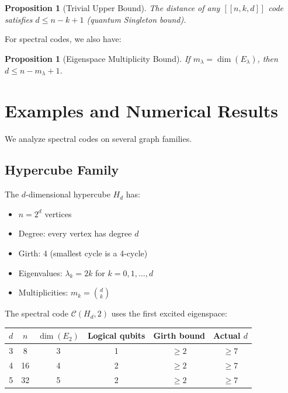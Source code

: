 \documentclass[11pt,a4paper]{article}
\newtheorem{proposition}[theorem]{Proposition}
\theoremstyle{definition}
\newcommand{\codespace}{\mathcal{C}}
\begin{document}
\begin{proposition}[Trivial Upper Bound]
The distance of any $[[n, k, d]]$ code satisfies $d \leq n - k + 1$ (quantum Singleton bound).
\end{proposition}

For spectral codes, we also have:

\begin{proposition}[Eigenspace Multiplicity Bound]
If $m_\lambda = \dim(E_\lambda)$, then $d \leq n - m_\lambda + 1$.
\end{proposition}

\section{Examples and Numerical Results}
\label{sec:examples}

We analyze spectral codes on several graph families.

\subsection{Hypercube Family}

The $d$-dimensional hypercube $H_d$ has:
\begin{itemize}[noitemsep]
    \item $n = 2^d$ vertices
    \item Degree: every vertex has degree $d$
    \item Girth: 4 (smallest cycle is a 4-cycle)
    \item Eigenvalues: $\lambda_k = 2k$ for $k = 0, 1, \ldots, d$
    \item Multiplicities: $m_k = \binom{d}{k}$
\end{itemize}

The spectral code $\codespace(H_d, 2)$ uses the first excited eigenspace:

\begin{center}
\begin{tabular}{cccccc}
\toprule
$d$ & $n$ & $\dim(E_2)$ & Logical qubits & Girth bound & Actual $d$ \\
\midrule
3 & 8 & 3 & 1 & $\geq 2$ & $\geq 7$ \\
4 & 16 & 4 & 2 & $\geq 2$ & $\geq 7$ \\
5 & 32 & 5 & 2 & $\geq 2$ & $\geq 7$ \\
\bottomrule
\end{tabular}
\end{center}
\end{document}
